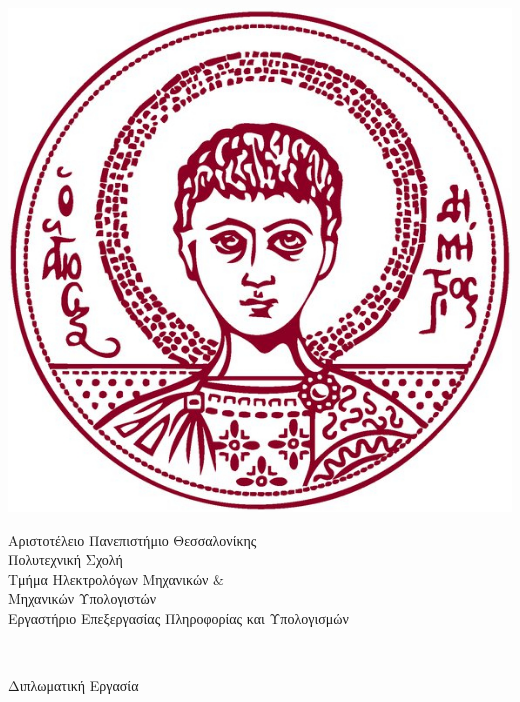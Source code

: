 \begin{titlepage}

  \begin{minipage}{0.25\textwidth}
    \begin{flushleft}
      \includegraphics[scale=0.35]{./images/title/authLogoTr.jpg}
    \end{flushleft}
  \end{minipage}
  \begin{minipage}{0.9\textwidth}
    \begin{flushleft}
      \large Αριστοτέλειο Πανεπιστήμιο Θεσσαλονίκης \\ [0.1cm]
      Πολυτεχνική Σχολή \\ [0.1cm]
      Τμήμα Ηλεκτρολόγων Μηχανικών $\&$ \\ Μηχανικών Υπολογιστών\\ [0.1cm]

      \normalsize{Εργαστήριο Επεξεργασίας Πληροφορίας και Υπολογισμών} \\[0.1cm]
    \end{flushleft}
  \end{minipage} \\[1.7cm]




  \begin{center}
    \Large Διπλωματική Εργασία \\[0.8cm]


\end{center}
\end{titlepage}
